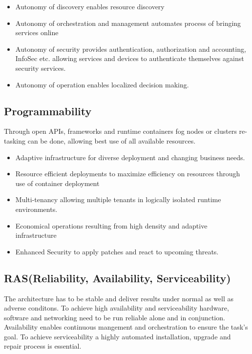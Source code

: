 \begin{itemize}
	\item Autonomy of discovery enables resource discovery
	\item Autonomy of orchestration and management automates process of bringing services online
	\item Autonomy of security provides authentication, authorization and accounting, InfoSec etc. allowing services and devices to authenticate themselves against security services.
	\item Autonomy of operation enables localized decision making.
\end{itemize}

\subsection{Programmability}

Through open APIs, frameworks and runtime containers fog nodes or clusters re-tasking can be done, allowing best use of all available resources.\cite[p. 13]{OpenFog}

\begin{itemize}
	\item Adaptive infrastructure for diverse deployment and changing business needs.
	\item Resource efficient deployments to maximize efficiency on resources through use of container deployment
	\item Multi-tenancy allowing multiple tenants in logically isolated runtime environments.
	\item Economical operations resulting from high density and adaptive infrastructure
	\item Enhanced Security to apply patches and react to upcoming threats.
\end{itemize}

\subsection{RAS(Reliability, Availability, Serviceability)}

The architecture has to be stable and deliver results under normal as well as adverse conditons.
To achieve high availability and serviceability  hardware, software and networking need to be run reliable alone and in conjunction.
Availability enables continuous mangement and orchestration to ensure the task's goal.
To achieve serviceability a highly automated installation, upgrade and repair process is essential.\cite[p. 13]{OpenFog}

